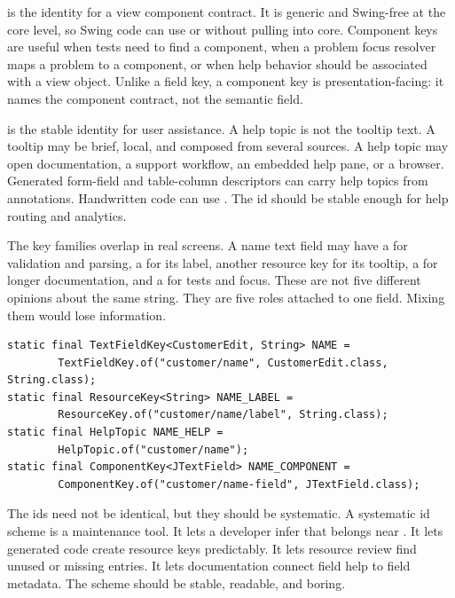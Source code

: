  is the identity for a view component contract. It is
generic and Swing-free at the core level, so Swing code can use
 or  without pulling
 into core. Component keys are useful when tests need to
find a component, when a problem focus resolver maps a problem to a component,
or when help behavior should be associated with a view object. Unlike a field
key, a component key is presentation-facing: it names the component contract,
not the semantic field.

 is the stable identity for user assistance. A help topic is not
the tooltip text. A tooltip may be brief, local, and composed from several
sources. A help topic may open documentation, a support workflow, an embedded
help pane, or a browser. Generated form-field and table-column descriptors can
carry help topics from annotations. Handwritten code can use
. The id should be stable enough for help routing and
analytics.

The key families overlap in real screens. A name text field may have a
 for validation and parsing, a
 for its label, another resource key for its tooltip,
a  for longer documentation, and a
 for tests and focus. These are not five
different opinions about the same string. They are five roles attached to one
field. Mixing them would lose information.

\begin{lstlisting}[caption={A generated-style key family for one field.}]
static final TextFieldKey<CustomerEdit, String> NAME =
        TextFieldKey.of("customer/name", CustomerEdit.class, String.class);
static final ResourceKey<String> NAME_LABEL =
        ResourceKey.of("customer/name/label", String.class);
static final HelpTopic NAME_HELP =
        HelpTopic.of("customer/name");
static final ComponentKey<JTextField> NAME_COMPONENT =
        ComponentKey.of("customer/name-field", JTextField.class);
\end{lstlisting}

The ids need not be identical, but they should be systematic. A systematic id
scheme is a maintenance tool. It lets a developer infer that
 belongs near . It lets generated
code create resource keys predictably. It lets resource review find unused or
missing entries. It lets documentation connect field help to field metadata.
The scheme should be stable, readable, and boring.

